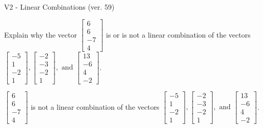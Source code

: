 \begin{exercise}
  \begin{exerciseTitle}V2 - Linear Combinations (ver. 59)\end{exerciseTitle}
  \begin{exerciseStatement}
    Explain why the vector \(\left[\begin{array}{c}
6 \\
6 \\
-7 \\
4
\end{array}\right]\)  is or is not a linear 
	combination of the vectors \(\left[\begin{array}{c}
-5 \\
1 \\
-2 \\
1
\end{array}\right] , \left[\begin{array}{c}
-2 \\
-3 \\
-2 \\
1
\end{array}\right] , \text{ and } \left[\begin{array}{c}
13 \\
-6 \\
4 \\
-2
\end{array}\right]\).
	


  \end{exerciseStatement}
  \begin{exerciseAnswer}
   \(\left[\begin{array}{c}
6 \\
6 \\
-7 \\
4
\end{array}\right]\) 
  	 is not  
	a linear combination of the vectors \(\left[\begin{array}{c}
-5 \\
1 \\
-2 \\
1
\end{array}\right] , \left[\begin{array}{c}
-2 \\
-3 \\
-2 \\
1
\end{array}\right] , \text{ and } \left[\begin{array}{c}
13 \\
-6 \\
4 \\
-2
\end{array}\right]\).

	
  


  \end{exerciseAnswer}
\end{exercise}